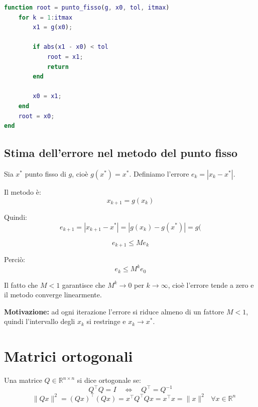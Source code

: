 \documentclass[12pt,a4paper]{article}
\begin{document}
\begin{flushleft}
\end{flushleft}

\vspace{1em}
\begin{lstlisting}[language=Matlab]
function root = punto_fisso(g, x0, tol, itmax)
    for k = 1:itmax
        x1 = g(x0);
        
        if abs(x1 - x0) < tol
            root = x1;
            return
        end
        
        x0 = x1;
    end
    root = x0;
end
\end{lstlisting}
\newpage
\subsection*{Stima dell'errore nel metodo del punto fisso}
Sia \(x^*\) punto fisso di \(g\), cioè \(g(x^*) = x^*\). Definiamo l'errore \(e_k = |x_k - x^*|\).

Il metodo è:
\[
x_{k+1} = g(x_k)
\]

Quindi:
\[
e_{k+1} = |x_{k+1} - x^*| = |g(x_k) - g(x^*)| =g(
\]

\[
e_{k+1} \le M e_k
\]

Perciò:
\[
e_k \le M^k e_0
\]

Il fatto che \(M < 1\) garantisce che \(M^k \to 0\) per \(k \to \infty\), cioè l'errore tende a zero e il metodo converge linearmente.

\textbf{Motivazione:} ad ogni iterazione l'errore si riduce almeno di un fattore \(M < 1\), quindi l’intervallo degli \(x_k\) si restringe e \(x_k \to x^*\).

\newpage

\section*{Matrici ortogonali}
Una matrice \( Q \in \mathbb{R}^{n \times n} \) si dice ortogonale se:
\[
Q^\top Q = I \quad \Longleftrightarrow \quad Q^\top = Q^{-1}
\]
\[
\quad \|Qx\|^2 = (Qx)^\top (Qx) = x^\top Q^\top Q x = x^\top x = \|x\|^2 \text{ 
 }\forall x \in \mathbb{R}^n
\]
\end{document}
